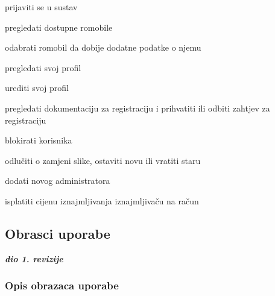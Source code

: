 \begin{packed_enum}
\begin{packed_enum}
			\end{packed_enum}
			\item  {}
			
			\begin{packed_enum}
			
			\item prijaviti se u sustav
			\item pregledati dostupne romobile 
			\item odabrati romobil da dobije dodatne podatke o njemu
			\item pregledati svoj profil
			\item urediti svoj profil
			\item pregledati dokumentaciju za registraciju i prihvatiti ili odbiti zahtjev za registraciju
			\item blokirati korisnika
			\item odlučiti o zamjeni slike, ostaviti novu ili vratiti staru
			\item dodati novog administratora
			
			\end{packed_enum}
			\item  {}
			
			\item  {}
			
			\begin{packed_enum}
			
			\item isplatiti cijenu iznajmljivanja iznajmljivaču na račun
			
			
			
			\end{packed_enum}
		\end{packed_enum}
			
			\eject 
			
			
				
			\subsection{Obrasci uporabe}
				
				\textbf{\textit{dio 1. revizije}}
				
				\subsubsection{Opis obrazaca uporabe}
					
